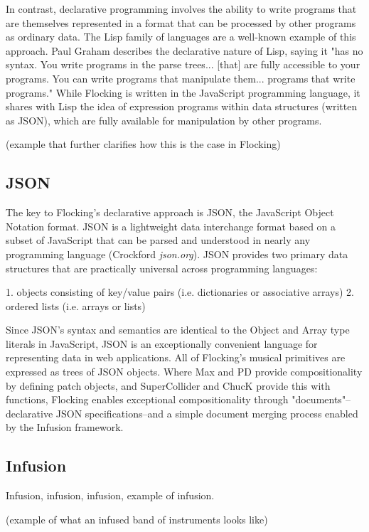 \documentclass{article}
\begin{document}
In contrast, declarative programming involves the ability to write programs that are themselves represented in a format that can be processed by other programs as ordinary data. The Lisp family of languages are a well-known example of this approach. Paul Graham describes the declarative nature of Lisp, saying it "has no syntax. You write programs in the parse trees... [that] are fully accessible to your programs. You can write programs that manipulate them... programs that write programs." While Flocking is written in the JavaScript programming language, it shares with Lisp the idea of expression programs within data structures (written as JSON), which are fully available for manipulation by other programs.

(example that further clarifies how this is the case in Flocking)

\subsection{JSON}

The key to Flocking's declarative approach is JSON, the JavaScript Object Notation format. JSON is a lightweight data interchange format based on a subset of JavaScript that can be parsed and understood in nearly any programming language (Crockford {\it json.org}). JSON provides two primary data structures that are practically universal across programming languages:

1. objects consisting of key/value pairs (i.e. dictionaries or associative arrays)
2. ordered lists (i.e. arrays or lists)

Since JSON's syntax and semantics are identical to the Object and Array type literals in JavaScript, JSON is an exceptionally convenient language for representing data in web applications. All of Flocking's musical primitives are expressed as trees of JSON objects. Where Max and PD provide compositionality by defining patch objects, and SuperCollider and ChucK provide this with functions, Flocking enables exceptional compositionality through "documents"--declarative JSON specifications--and a simple document merging process enabled by the Infusion framework.

\subsection{Infusion}
Infusion, infusion, infusion, example of infusion.

(example of what an infused band of instruments looks like)
\end{document}

